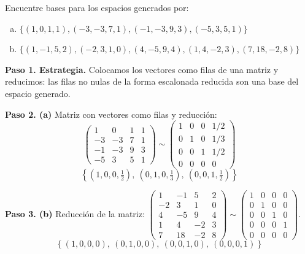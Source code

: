 \begin{prob} Encuentre bases para los espacios generados por:
\begin{enumerate}[(a)]
\item $\{ (1,0,1,1), (-3,-3,7,1), (-1,-3,9,3), (-5,3,5,1) \}$
\item $\{ (1,-1,5,2), (-2,3,1,0), (4,-5,9,4), (1,4,-2,3), (7,18,-2,8) \}$
\end{enumerate}

\begin{myproof}
\textbf{Paso 1. Estrategia.} Colocamos los vectores como filas de una matriz y reducimos: las filas no nulas de la forma escalonada reducida son una base del espacio generado.

\textbf{Paso 2. (a)} Matriz con vectores como filas y reducción:
$$\begin{pmatrix} 1 & 0 & 1 & 1 \\ -3 & -3 & 7 & 1 \\ -1 & -3 & 9 & 3 \\ -5 & 3 & 5 & 1 \end{pmatrix} \sim \begin{pmatrix} 1 & 0 & 0 & 1/2 \\ 0 & 1 & 0 & 1/3 \\ 0 & 0 & 1 & 1/2 \\ 0 & 0 & 0 & 0 \end{pmatrix}$$
$$\boxed{\left\{ \left(1,0,0,\tfrac{1}{2}\right),\ \left(0,1,0,\tfrac{1}{3}\right),\ \left(0,0,1,\tfrac{1}{2}\right) \right\}}$$

\textbf{Paso 3. (b)} Reducción de la matriz: $\begin{pmatrix} 1 & -1 & 5 & 2 \\ -2 & 3 & 1 & 0 \\ 4 & -5 & 9 & 4 \\ 1 & 4 & -2 & 3 \\ 7 & 18 & -2 & 8 \end{pmatrix} \sim \begin{pmatrix} 1 & 0 & 0 & 0 \\ 0 & 1 & 0 & 0 \\ 0 & 0 & 1 & 0 \\ 0 & 0 & 0 & 1 \\ 0 & 0 & 0 & 0 \end{pmatrix}.$
$$\boxed{\left\{ (1,0,0,0),\ (0,1,0,0),\ (0,0,1,0),\ (0,0,0,1) \right\}}$$
\end{myproof}
\end{prob}


